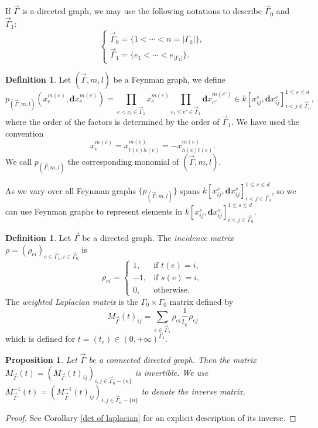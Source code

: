 \documentclass[11pt]{amsart}
\newtheorem{prop}[thm]{Proposition}
\theoremstyle{definition}
\newtheorem{defn}[thm]{Definition}
\theoremstyle{remark}
\numberwithin{equation}{section}
\begin{document}
If $\vec{\Gamma}$ is a directed graph, we may use the following notations to describe $\vec{\Gamma}_{0}$ and $\vec{\Gamma}_{1}$:
$$
\begin{cases}
    \vec{\Gamma}_{0}=\{1<\cdots<n=|\Gamma_{0}|\},\\
    \vec{\Gamma}_{1}=\{e_{1}<\cdots<e_{|\Gamma_{1}|}\}.
\end{cases}
$$
\begin{defn}\label{dfn:poly}
    Let $(\vec{\Gamma},m,l)$ be a Feynman graph, we define
    $$
    p_{(\vec{\Gamma},m,l)}(x_{e}^{m(e)},\mathbf{d}x_{e}^{m(e)})=\prod_{e<e_{l}\in\vec{\Gamma}_{1}}x_{e}^{m(e)}\prod_{e_l\leq e'\in\vec{\Gamma}_{1}}\mathbf{d}x_{e'}^{m(e')}\in k[x_{ij}^{s},\mathbf{d}x_{ij}^{s}]_{i<j\in\vec{\Gamma}_{0}}^{1\leq s\leq d},
    $$
    where the order of the factors is determined by the order of $\vec{\Gamma}_{1}$. We have used the convention
    $$
    x_{e}^{m(e)}=x_{t(e)h(e)}^{m(e)}=-x_{h(e)t(e)}^{m(e)}.
    $$
    We call $p_{(\vec{\Gamma},m,l)}$ the corresponding monomial of $(\vec{\Gamma},m,l)$.
\end{defn}

As we vary over all Feynman graphs $\{p_{(\vec{\Gamma},m,l)}\}$ spans $k[x_{ij}^{s},\mathbf{d}x_{ij}^{s}]_{i<j\in\vec{\Gamma}_{0}}^{1\leq s\leq d}$, so we can use Feynman graphs to represent elements in $k[x_{ij}^{s},\mathbf{d}x_{ij}^{s}]_{i<j\in\vec{\Gamma}_{0}}^{1\leq s\leq d}$.


\begin{defn}
  Let $\vec{\Gamma}$ be a directed graph. The \textit{incidence matrix} $\rho=(\rho_{ei})_{e\in\vec{\Gamma}_{1},
  i\in\vec{\Gamma}_{0}}$ is
    $$
    \rho_{ei}=
    \begin{cases}
        1, &\text{if }t(e)=i,\\
        -1, &\text{if }s(e)=i,\\
        0, &\text{otherwise.}
    \end{cases}
    $$
    The \textit{weighted Laplacian matrix} is the $\Gamma_0 \times \Gamma_0$ matrix defined by
    $$
    M_{\vec{\Gamma}}(t)_{ij}=
    \sum_{e\in\vec{\Gamma}_{1}}\rho_{ei}\frac{1}{t_{e}}\rho_{ej}
    $$
    which is defined for $t = (t_e) \in (0,+\infty)^{\Gamma_1}$.
\end{defn}
\begin{prop}\label{Minverse}
    Let $\vec{\Gamma}$ be a connected directed graph. 
    Then the matrix $M_{\vec{\Gamma}}(t)=(M_{\vec{\Gamma}}(t)_{ij})_{i,j\in\vec{\Gamma}_{0}-\{n\}}$ is invertible. We use $M^{-1}_{\vec{\Gamma}}(t)=(M^{-1}_{\vec{\Gamma}}(t)_{ij})_{i,j\in\vec{\Gamma}_{0}-\{n\}}$ to denote the inverse matrix.
\end{prop}
\begin{proof}
    See Corollary \ref{det of laplacian} for an explicit description of its inverse.
\end{proof}
\end{document}
